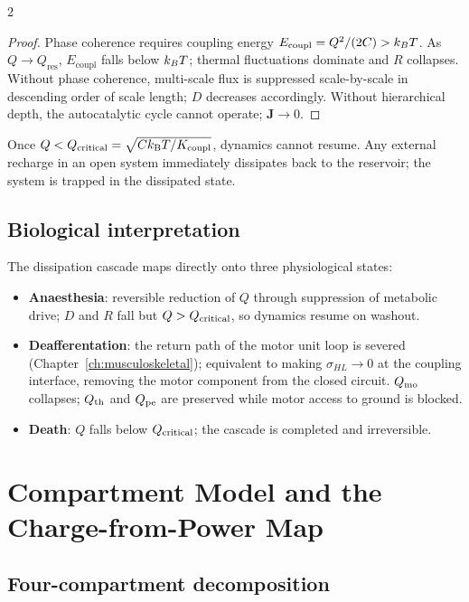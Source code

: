 \begin{multicols}{2}
\begin{proof}
Phase coherence requires coupling energy $E_{\mathrm{coupl}} = Q^2/(2C) >
k_B T$.  As $Q \to Q_{\mathrm{res}}$, $E_{\mathrm{coupl}}$ falls below
$k_B T$; thermal fluctuations dominate and $R$ collapses.  Without phase
coherence, multi-scale flux is suppressed scale-by-scale in descending order
of scale length; $D$ decreases accordingly.  Without hierarchical depth, the
autocatalytic cycle cannot operate; $\mathbf{J} \to 0$.
\end{proof}

\begin{theorem}
\label{thm:ch07-irreversible}
Once $Q < Q_{\mathrm{critical}} = \sqrt{Ck_{\mathrm{B}}T/K_{\mathrm{coupl}}}$, dynamics
cannot resume.  Any external recharge in an open system immediately dissipates
back to the reservoir; the system is trapped in the dissipated state.
\end{theorem}

\subsection{Biological interpretation}

The dissipation cascade maps directly onto three physiological states:
\begin{itemize}[leftmargin=*,itemsep=1pt]
  \item \textbf{Anaesthesia}: reversible reduction of $Q$ through suppression
        of metabolic drive; $D$ and $R$ fall but $Q > Q_{\mathrm{critical}}$, so dynamics
        resume on washout.
  \item \textbf{Deafferentation}: the return path of the motor unit loop is
        severed (Chapter~\ref{ch:musculoskeletal}); equivalent to making
        $\sigma_{HL} \to 0$ at the coupling interface, removing the motor
        component from the closed circuit.  $Q_{\mathrm{mo}}$ collapses; $Q_{\mathrm{th}}$ and
        $Q_{\mathrm{pe}}$ are preserved while motor access to ground is blocked.
  \item \textbf{Death}: $Q$ falls below $Q_{\mathrm{critical}}$; the cascade is completed
        and irreversible.
\end{itemize}

\section{Compartment Model and the Charge-from-Power Map}
\label{sec:ch07-compartments}

\subsection{Four-compartment decomposition}


\end{multicols}
